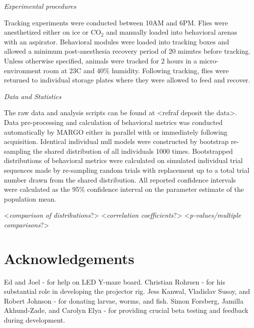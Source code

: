 \documentclass[10pt]{article}
\begin{document}
\begin{multicols}{2}
\textit{Experimental procedures}

Tracking experiments were conducted between 10AM and 6PM. Flies were anesthetized either on ice or CO$_{2}$ and manually loaded into behavioral arenas with an aspirator. Behavioral modules were loaded into tracking boxes and allowed a minimum post-anesthesia recovery period of 20 minutes before tracking. Unless otherwise specified, animals were tracked for 2 hours in a micro-environment room at 23\degree  C and 40\% humidity. Following tracking, flies were returned to individual storage plates where they were allowed to feed and recover.

\textit{Data and Statistics}

The raw data and analysis scripts can be found at <refraf deposit the data>. Data pre-processing and calculation of behavioral metrics was conducted automatically by MARGO either in parallel with or immediately following acquisition. Identical individual null models were constructed by bootstrap re-sampling the shared distribution of all individuals 1000 times. Bootstrapped distributions of behavioral metrics were calculated on simulated individual trial sequences made by re-sampling random trials with replacement up to a total trial number drawn from the shared distribution. All reported confidence intervals were calculated as the 95\% confidence interval on the parameter estimate of the population mean.

<\textit{comparison of distributions}?>
<\textit{correlation coefficients}?>
<\textit{p-values/multiple comparisons}?>

\section*{Acknowledgements}

Ed and Joel - for help on LED Y-maze board.
Christian Rohrsen - for his substantial role in developing the projector rig.
Jess Kanwal, Vladislav Susoy, and Robert Johnson - for donating larvae, worms, and fish.
Simon Forsberg, Jamilla Akhund-Zade, and Carolyn Elya - for providing crucial beta testing and feedback during development.

 
\end{multicols}

\newpage
\end{document}
